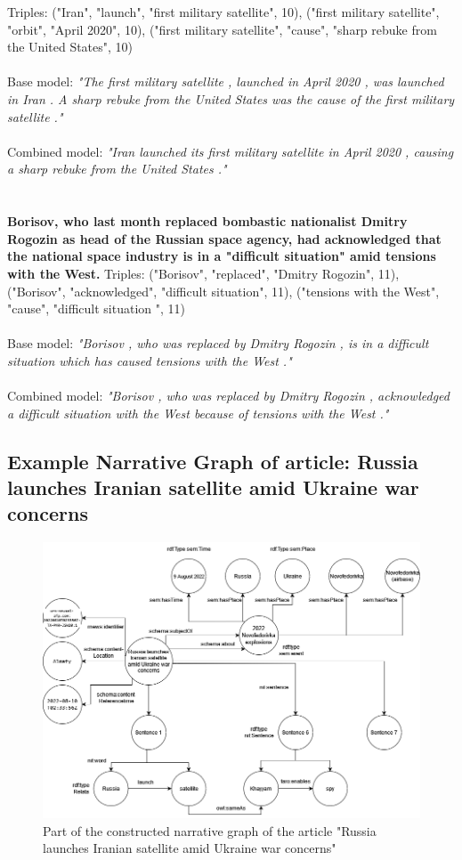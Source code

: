 \documentclass[
hf, %
]{ceurart}
\begin{document}
\noindent
Triples: ("Iran", "launch", "first military satellite", 10), ("first military satellite", "orbit", "April 2020", 10), ("first military satellite", "cause", "sharp rebuke from the United States", 10)\\\\
\noindent
Base model: \textit{"The first military satellite , launched in April 2020 , was launched in Iran . A sharp rebuke from the United States was the cause of the first military satellite ."}\\\\
\noindent
Combined model: \textit{"Iran launched its first military satellite in April 2020 , causing a sharp rebuke from the United States ."}\\\\\\
\noindent
\textbf{Borisov, who last month replaced bombastic nationalist Dmitry Rogozin as head of the Russian space agency, had acknowledged that the national space industry is in a "difficult situation" amid tensions with the West.}
\noindent
Triples: ("Borisov", "replaced", "Dmitry Rogozin", 11), ("Borisov", "acknowledged", "difficult situation", 11), ("tensions with the West", "cause", "difficult situation ", 11)\\\\
\noindent
Base model: \textit{"Borisov , who was replaced by Dmitry Rogozin , is in a difficult situation which has caused tensions with the West ."}\\\\
\noindent
Combined model: \textit{"Borisov , who was replaced by Dmitry Rogozin , acknowledged a difficult situation with the West because of tensions with the West ."}

\subsection{Example Narrative Graph of article: Russia launches Iranian satellite amid Ukraine war concerns}
\begin{figure}
	\includegraphics[scale=0.45]{Images/NG_article.png}
	\caption{Part of the constructed narrative graph of the article "Russia launches Iranian satellite amid Ukraine war concerns"}
	\label{fig:NG_article}
\end{figure}
\clearpage
\end{document}

